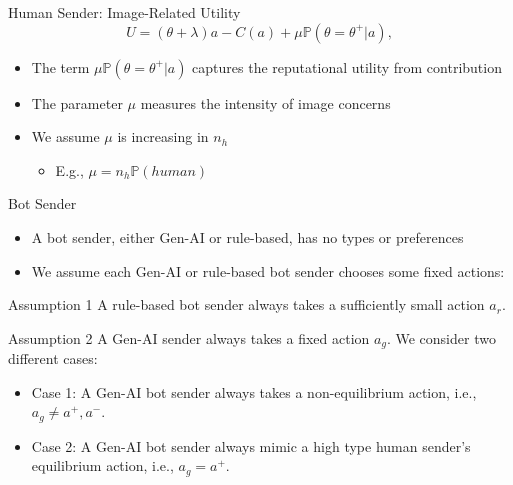 \documentclass[9pt]{beamer}
\begin{document}
\begin{frame}{Human Sender: Image-Related Utility}
\begin{equation*}
    U = (\theta + \lambda )a - C(a) + \mu \mathbb{P}(\theta=\theta^+|a),
\end{equation*}
\vspace{.5em}

\begin{itemize}\setlength{\itemsep}{1em}
    \item The term $\mu \mathbb{P}(\theta=\theta^+|a)$ captures the reputational utility from contribution
    \item The parameter $\mu$ measures the intensity of image concerns
    \item We assume $\mu$ is increasing in $n_h$
    \vspace{.5em}
    \begin{itemize}
        \item E.g., $\mu = n_h \mathbb{P}(human)$
    \end{itemize}
\end{itemize}
\end{frame}

\begin{frame}{Bot Sender}
\begin{itemize}\setlength{\itemsep}{1em}
    \item A bot sender, either Gen-AI or rule-based, has no types or preferences
    \item We assume each Gen-AI or rule-based bot sender chooses some fixed actions:
\end{itemize}
\vspace{1em}

\begin{exampleblock}{Assumption 1}
    A rule-based bot sender always takes a sufficiently small action $a_r$.
\end{exampleblock}

\begin{exampleblock}{Assumption 2}
    A Gen-AI sender always takes a fixed action $a_g$. We consider two different cases:
    \begin{itemize}
        \item Case 1: A Gen-AI bot sender always takes a non-equilibrium action, i.e., $a_g\neq a^+,a^-$.
        \item Case 2: A Gen-AI bot sender always mimic a high type human sender's equilibrium action, i.e., $a_g=a^+$.
    \end{itemize}
\end{exampleblock}
\end{frame}
\end{document}
